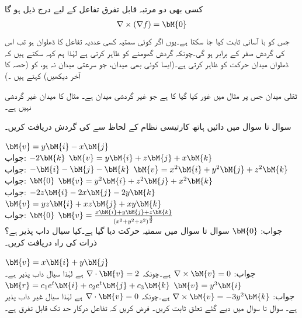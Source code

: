 کسی بھی دو مرتبہ قابل تفرق تفاعل  کے لیے درج ذیل ہو گا
\begin{align}\label{مساوات_خطی_تکمل_ڈھلوان_کی_گردش_صفر}
\nabla \times (\nabla f)=\bM{0}
\end{align}
جس کو با آسانی ثابت کیا جا سکتا ہے۔یوں اگر کوئی سمتیہ کسی عددیہ تفاعل کا ڈھلوان ہو تب اس کی گردش صفر کے برابر ہو گی۔چونکہ گردش گھومنے کو ظاہر کرتی ہے لہٰذا ہم کہہ سکتے ہیں کہ ڈھلوان میدان  حرکت کو ظاہر کرتی ہے۔(ایسا کوئی بھی میدان، جو سرعتی   میدان نہ ہو، کو  (حصہ  کا آخر دیکھیں) کہتے ہیں ۔)

ثقلی میدان جس پر مثال  میں غور کیا گیا کا  ہے جو غیر گردشی میدان ہے۔ مثال  کا میدان غیر گردشی نہیں ہے۔

سوال  تا سوال  میں دائیں ہاتھ کارتیسی نظام کے لحاظ سے  کی گردش دریافت کریں۔

\quad
$\bM{v}=y\bM{i}-x\bM{j}$\\
جواب:
$-2\bM{k}$
\quad
$\bM{v}=y\bM{i}+z\bM{j}+x\bM{k}$\\
جواب:
$-\bM{i}-\bM{j}-\bM{k}$
\quad
$\bM{v}=x^2\bM{i}+y^2\bM{j}+z^2\bM{k}$\\
جواب:
$\bM{0}$
\quad
$\bM{v}=y^2\bM{i}+z^2\bM{j}+x^2\bM{k}$\\
جواب:
$-2z\bM{i}-2x\bM{j}-2y\bM{k}$
\quad
$\bM{v}=yz\bM{i}+xz\bM{j}+xy\bM{k}$\\
جواب:
$\bM{0}$
\quad
$\bM{v}=\frac{x\bM{i}+y\bM{j}+z\bM{k}}{(x^2+y^2+z^2)^{\frac{3}{2}}}$\\
جواب:
$\bM{0}$
سوال  تا سوال  میں سمتیہ حرکت  دیا گیا ہے۔کیا سیال داب پذیر ہے؟ ذرات کی راہ دریافت کریں۔

 \quad
$\bM{v}=x\bM{i}+y\bM{j}$\\
جواب:\quad
$\nabla \times \bM{v}=0$
ہے۔چونکہ 
$\nabla \cdot \bM{v}=2$
ہے لہٰذا سیال داب پذیر ہے۔
$\bM{r}=c_1e^t\bM{i}+c_2e^t\bM{j}+c_3\bM{k}$
\quad
$\bM{v}=y^3\bM{i}$\\
جواب:\quad
$\nabla \times \bM{v}=-3y^2\bM{k}$
ہے۔چونکہ 
$\nabla \cdot \bM{v}=0$
ہے لہٰذا سیال غیر داب پذیر ہے۔
سوال  تا سوال  میں دیے گئے تعلق ثابت کریں۔ فرض کریں کہ تفاعل درکار حد تک قابل تفرق ہے۔

